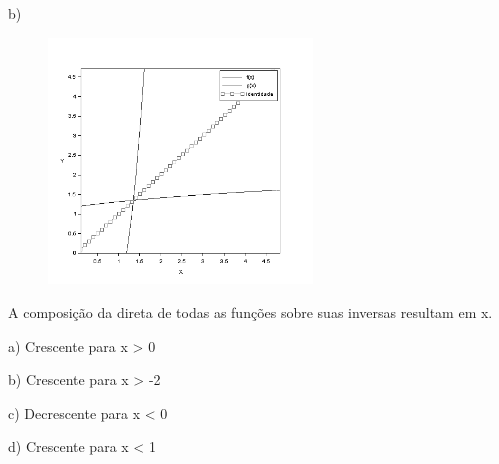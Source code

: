 \begin{respostas}{6}
b)\begin{figure}[H]
    \begin{Center}
        \includegraphics[width=2.76in,height=2.57in]{capitulos/logaritmos_e_funcao_logaritmica/media/image18.png}
    \end{Center}
\end{figure}

    \ansitem{} A composição da direta de todas as funções sobre suas inversas resultam em x.

    \ansitem{}
        a) Crescente para x > 0

        b) Crescente para x > -2

        c) Decrescente para x < 0

        d) Crescente para x < 1

\end{respostas}

